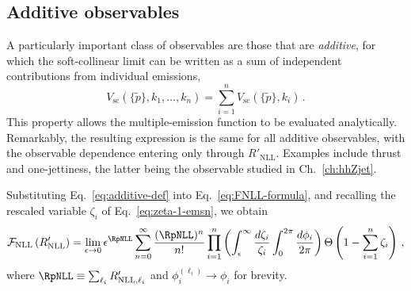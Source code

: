 \subsection{Additive observables}
\label{subsec:additive}

A particularly important class of observables are those that are 
\emph{additive}, for which the soft-collinear limit can be
written as a sum of independent contributions from individual
emissions,
\begin{equation}
\label{eq:additive-def}
    V_{\mathrm{sc}}(\{\tilde{p}\},k_1,\dots,k_n) = \sum_{i=1}^n V_{\mathrm{sc}}(\{\tilde{p}\},k_i)\,.
\end{equation}
This property allows the multiple-emission function to be evaluated analytically. 
Remarkably, the resulting expression is the same for all additive observables, 
with the observable dependence entering only through $R'_{\mathrm{NLL}}$. 
Examples include thrust and one-jettiness, the latter being the observable studied in Ch.~\ref{ch:hhZjet}.


Substituting Eq.~\eqref{eq:additive-def} into Eq.~\eqref{eq:FNLL-formula}, and
recalling the rescaled variable $\zeta_i$ of Eq.~\eqref{eq:zeta-1-emsn}, we
obtain
\begin{equation}
 \label{eq:FNLL-add-1}
 \mathcal{F}_{\mathrm{NLL}}\left(R'_{\mathrm{NLL}}\right)=\lim_{\epsilon\to 0} \epsilon^{\RpNLL} \sum_{n=0}^\infty\frac{(\RpNLL)^n}{n!}  \prod_{i=1}^n \left(\int_{\epsilon}^\infty \frac{d\zeta_i}{\zeta_i}\int_0^{2\pi}\frac{d\phi_i}{2\pi}\right) \Theta\left(1-\sum_{i=1}^n\zeta_i\right)\,,
\end{equation}
where $\RpNLL\equiv \sum_{\ell_i} R'_{\mathrm{NLL},\ell_i}$ and $\phi_i^{(\ell_i)}\to\phi_i$ for
brevity.

